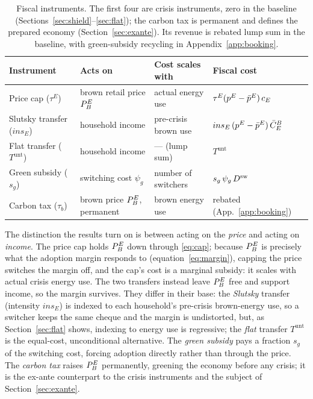\begin{table}[H]
\centering\small
\begin{tabular}{llll}
\toprule
Instrument & Acts on & Cost scales with & Fiscal cost \\
\midrule
Price cap ($\tau^E$) & brown retail price $P^{E}_{B}$ & actual energy use & $\tau^E(p^{E}-\bar p^E)\,c_E$ \\
Slutsky transfer ($ins_E$) & household income & pre-crisis brown use & $ins_E\,(p^{E}-\bar p^E)\,\bar C^B_E$ \\
Flat transfer ($T^{\mathrm{unt}}$) & household income & --- (lump sum) & $T^{\mathrm{unt}}$ \\
Green subsidy ($s_g$) & switching cost $\psi_g$ & number of switchers & $s_g\,\psi_g\,D^{\mathrm{sw}}$ \\
\midrule
Carbon tax ($\tau_b$) & brown price $P^{E}_{B}$, permanent & brown energy use & rebated (App.~\ref{app:booking}) \\
\bottomrule
\end{tabular}
\caption{Fiscal instruments. The first four are crisis instruments, zero in the
baseline (Sections~\ref{sec:shield}--\ref{sec:flat}); the carbon tax is permanent and
defines the prepared economy (Section~\ref{sec:exante}). Its revenue is rebated lump
sum in the baseline, with green-subsidy recycling in Appendix~\ref{app:booking}.}
\label{tab:instruments}
\end{table}

The distinction the results turn on is between acting on the \emph{price} and acting
on \emph{income}. The price cap holds $P^{E}_{B}$ down through \eqref{eq:cap}; because
$P^{E}_{B}$ is precisely what the adoption margin responds to (equation~\eqref{eq:margin}),
capping the price switches the margin off, and the cap's cost is a marginal
subsidy: it scales with actual crisis energy use. The two transfers instead leave
$P^{E}_{B}$ free and support income, so the margin survives. They differ in their base: the
\emph{Slutsky} transfer (intensity $ins_E$) is indexed to each household's pre-crisis
brown-energy use, so a switcher keeps the same cheque and the margin is
undistorted, but, as Section~\ref{sec:flat} shows, indexing to energy use is
regressive; the \emph{flat} transfer $T^{\mathrm{unt}}$ is the equal-cost,
unconditional alternative. The \emph{green subsidy} pays a
fraction $s_g$ of the switching cost, forcing adoption directly rather than through
the price. The \emph{carbon tax} raises $P^{E}_{B}$ permanently, greening the economy
before any crisis; it is the ex-ante counterpart to the crisis instruments and the
subject of Section~\ref{sec:exante}.

